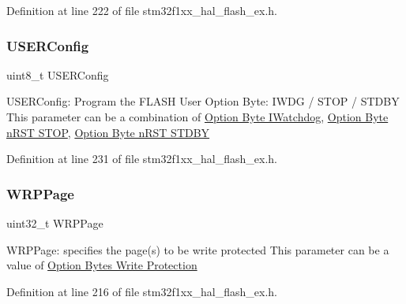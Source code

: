 Definition at line 222 of file stm32f1xx\+\_\+hal\+\_\+flash\+\_\+ex.\+h.

\mbox{\label{struct_f_l_a_s_h___o_b_program_init_type_def_ac4ab84c90f7a878b0b39ec1f3dda8ded}} 
\subsubsection{\texorpdfstring{U\+S\+E\+R\+Config}{USERConfig}}
{\footnotesize\ttfamily uint8\+\_\+t U\+S\+E\+R\+Config}

U\+S\+E\+R\+Config\+: Program the F\+L\+A\+SH User Option Byte\+: I\+W\+DG / S\+T\+OP / S\+T\+D\+BY This parameter can be a combination of \hyperlink{group___f_l_a_s_h_ex___o_b___i_watchdog}{Option Byte I\+Watchdog}, \hyperlink{group___f_l_a_s_h_ex___o_b__n_r_s_t___s_t_o_p}{Option Byte n\+R\+ST S\+T\+OP}, \hyperlink{group___f_l_a_s_h_ex___o_b__n_r_s_t___s_t_d_b_y}{Option Byte n\+R\+ST S\+T\+D\+BY} 

Definition at line 231 of file stm32f1xx\+\_\+hal\+\_\+flash\+\_\+ex.\+h.

\mbox{\label{struct_f_l_a_s_h___o_b_program_init_type_def_ae5bf1ca4800efd0ac1f1663a4778766b}} 
\subsubsection{\texorpdfstring{W\+R\+P\+Page}{WRPPage}}
{\footnotesize\ttfamily uint32\+\_\+t W\+R\+P\+Page}

W\+R\+P\+Page\+: specifies the page(s) to be write protected This parameter can be a value of \hyperlink{group___f_l_a_s_h_ex___o_b___write___protection}{Option Bytes Write Protection} 

Definition at line 216 of file stm32f1xx\+\_\+hal\+\_\+flash\+\_\+ex.\+h.

